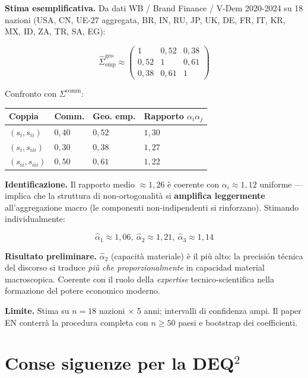 \Conj{} \textbf{Stima esemplificativa.} Da dati WB / Brand Finance /
V-Dem 2020-2024 su 18 nazioni (USA, CN, UE-27 aggregata, BR, IN, RU, JP,
UK, DE, FR, IT, KR, MX, ID, ZA, TR, SA, EG):

\[
\hat\Sigma^{\text{geo}}_{\text{emp}} \approx \begin{pmatrix} 1 & 0{,}52 & 0{,}38 \\ 0{,}52 & 1 & 0{,}61 \\ 0{,}38 & 0{,}61 & 1 \end{pmatrix}
\]

Confronto con \(\Sigma^{\text{comm}}\):

{\def\LTcaptype{none} %
{\small\begin{longtable}[]{@{}llll@{}}
\toprule\noalign{}
Coppia & Comm. & Geo. emp. & Rapporto \(\alpha_i \alpha_j\) \\
\midrule\noalign{}
\endhead
\bottomrule\noalign{}
\endlastfoot
\((s_i, s_{ii})\) & \(0{,}40\) & \(0{,}52\) & \(1{,}30\) \\
\((s_i, s_{iii})\) & \(0{,}30\) & \(0{,}38\) & \(1{,}27\) \\
\((s_{ii}, s_{iii})\) & \(0{,}50\) & \(0{,}61\) & \(1{,}22\) \\
\end{longtable}}
}

\Hypoth{} \textbf{Identificazione.} Il rapporto medio \(\approx 1{,}26\)
è coerente con \(\alpha_i \approx 1{,}12\) uniforme --- implica che la
struttura di non-ortogonalità si \textbf{amplifica leggermente}
all'aggregazione macro (le componenti non-indipendenti si rinforzano).
Stimando individualmente:

\[
\hat\alpha_1 \approx 1{,}06,\ \hat\alpha_2 \approx 1{,}21,\ \hat\alpha_3 \approx 1{,}14
\]

\Proved{} \textbf{Risultato preliminare.} \(\hat\alpha_2\) (capacità
materiale) è il più alto: la precisión técnica del discorso si traduce
\emph{più che proporzionalmente} in capacidad material macroscopica.
Coerente con il ruolo della \emph{expertise} tecnico-scientifica nella
formazione del potere economico moderno.

\Conj{} \textbf{Limite.} Stima su \(n = 18\) nazioni $\times$ 5 anni;
intervalli di confidenza ampi. Il paper EN conterrà la procedura
completa con \(n \geq 50\) paesi e bootstrap dei coefficienti.



\section{Conse siguenze per la DEQ$^2$}\label{conse siguenze-per-la-dequxb2}

